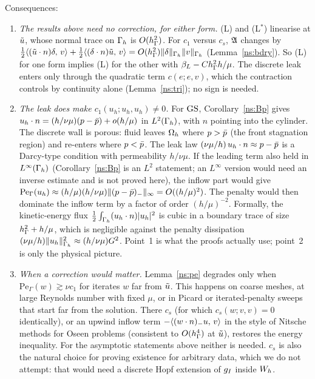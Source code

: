 Consequences:
\begin{enumerate}
\item \emph{The results above need no correction, for either form.} (L) and (L$^\ast$) linearise at $\tilde u$, whose normal trace on $\Gamma_h$ is $O(h_\Gamma^2)$. For $c_1$ versus $c_s$, $\mathfrak A$ changes by $\tfrac12\langle (\tilde u\cdot n)\delta,\, v\rangle+\tfrac12\langle (\delta\cdot n)\tilde u,\, v\rangle=O(h_\Gamma^2)\lVert \delta\rVert_{\Gamma_h}\lVert v\rVert_{\Gamma_h}$ (Lemma~\ref{ns:bdry}). So (L) for one form implies (L) for the other with $\beta_L-Ch_\Gamma^2h/\mu$. The discrete leak enters only through the quadratic term $c(e;e,v)$, which the contraction controls by continuity alone (Lemma~\ref{ns:tri}); no sign is needed.
\item \emph{The leak does make $c_1(u_h;u_h,u_h)\ne0$.} For $\mathrm{GS}$, Corollary~\ref{ns:Bp} gives $u_h\cdot n=(h/\nu\mu)(p-\bar p)+o(h/\mu)$ in $L^2(\Gamma_h)$, with $n$ pointing into the cylinder. The discrete wall is porous: fluid leaves $\Omega_h$ where $p>\bar p$ (the front stagnation region) and re-enters where $p<\bar p$. The leak law $(\nu\mu/h)\,u_h\cdot n\approx p-\bar p$ is a Darcy-type condition with permeability $h/\nu\mu$. If the leading term also held in $L^\infty(\Gamma_h)$ (Corollary~\ref{ns:Bp} is an $L^2$ statement; an $L^\infty$ version would need an inverse estimate and is not proved here), the inflow part would give $\mathrm{Pe}_\Gamma(u_h)\approx(h/\mu)(h/\nu\mu)\lVert (p-\bar p)_-\rVert_\infty=O((h/\mu)^2)$. The penalty would then dominate the inflow term by a factor of order $(h/\mu)^{-2}$. Formally, the kinetic-energy flux $\tfrac12\int_{\Gamma_h}(u_h\cdot n)|u_h|^2$ is cubic in a boundary trace of size $h_\Gamma^2+h/\mu$, which is negligible against the penalty dissipation $(\nu\mu/h)\lVert u_h\rVert^2_{\Gamma_h}\approx(h/\nu\mu)G^2$. Point~1 is what the proofs actually use; point~2 is only the physical picture.
\item \emph{When a correction would matter.} Lemma~\ref{ns:pe} degrades only when $\mathrm{Pe}_\Gamma(w)\gtrsim\nu c_1$ for iterates $w$ far from $\tilde u$. This happens on coarse meshes, at large Reynolds number with fixed $\mu$, or in Picard or iterated-penalty sweeps that start far from the solution. There $c_s$ (for which $c_s(w;v,v)=0$ identically), or an upwind inflow term $-\langle (w\cdot n)_-u,\, v\rangle$ in the style of Nitsche methods for Oseen problems (consistent to $O(h_\Gamma^4)$ at $\tilde u$), restores the energy inequality. For the asymptotic statements above neither is needed. $c_s$ is also the natural choice for proving existence for arbitrary data, which we do not attempt: that would need a discrete Hopf extension of $g_I$ inside $W_h$.
\end{enumerate}



